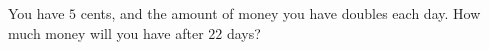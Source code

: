 You have $5$ cents, and the amount of money you have doubles each day. How much money will you have after $22$ days?
